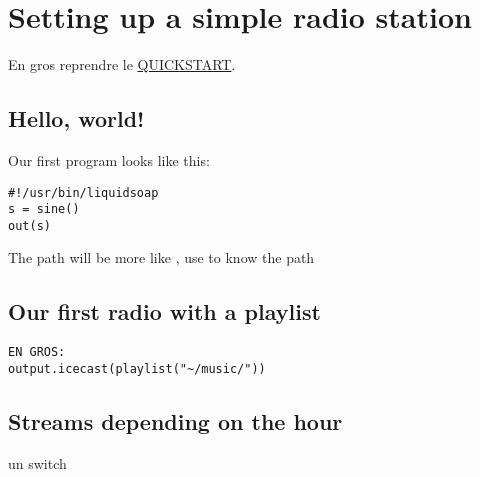 \chapter{Setting up a simple radio station}

En gros reprendre le \href{https://www.liquidsoap.info/doc-dev/quick_start.html}{QUICKSTART}.

\section{Hello, world!}
Our first program looks like this:
\begin{lstlisting}
#!/usr/bin/liquidsoap
s = sine()
out(s)
\end{lstlisting}

The path will be more like , use  to know the path

\section{Our first radio with a playlist}
\begin{verbatim}
EN GROS:
output.icecast(playlist("~/music/"))
\end{verbatim}

\section{Streams depending on the hour}
un switch
